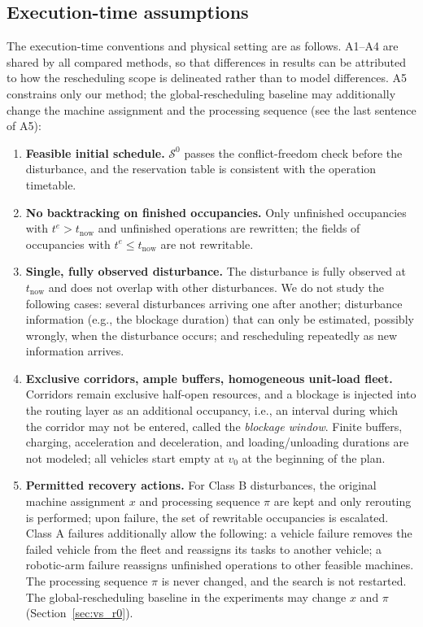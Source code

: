 \documentclass[manuscript,screen,review]{acmart}
\begin{document}
\subsection{Execution-time assumptions}
\label{sec:assumptions}

The execution-time conventions and physical setting are as follows. A1--A4 are shared by all compared methods, so that differences in results can be attributed to how the rescheduling scope
is delineated rather than to model differences. A5 constrains only our method; the global-rescheduling baseline may additionally change the machine assignment and the processing sequence (see the last sentence of A5):

\begin{enumerate}[label=\textbf{A\arabic*.},leftmargin=*,topsep=2pt,itemsep=2pt]
\item \textbf{Feasible initial schedule.} \(\mathcal{S}^0\) passes the conflict-freedom check before the disturbance, and the reservation table is consistent with the operation timetable.
\item \textbf{No backtracking on finished occupancies.} Only unfinished occupancies with \(t^e>t_{\mathrm{now}}\)
and unfinished operations are rewritten; the fields of occupancies with \(t^e\le t_{\mathrm{now}}\) are not rewritable.
\item \textbf{Single, fully observed disturbance.} The disturbance is fully observed at \(t_{\mathrm{now}}\) and does not overlap with other disturbances.
We do not study the following cases: several disturbances arriving one after another; disturbance information (e.g., the blockage duration) that can only be estimated, possibly wrongly, when the disturbance occurs;
and rescheduling repeatedly as new information arrives.
\item \textbf{Exclusive corridors, ample buffers, homogeneous unit-load fleet.} Corridors remain exclusive half-open resources, and a blockage is injected into the routing layer as an additional occupancy,
i.e., an interval during which the corridor may not be entered, called the \emph{blockage window}. Finite buffers, charging, acceleration and deceleration, and loading/unloading durations are not modeled;
all vehicles start empty at \(v_0\) at the beginning of the plan.
\item \textbf{Permitted recovery actions.} For Class B disturbances, the original machine assignment \(x\) and processing sequence \(\pi\) are kept and only rerouting is performed;
upon failure, the set of rewritable occupancies is escalated. Class A failures additionally allow the following: a vehicle failure removes the failed vehicle from the fleet and reassigns its tasks to another vehicle;
a robotic-arm failure reassigns unfinished operations to other feasible machines. The processing sequence \(\pi\) is never changed, and the search is not restarted.
The global-rescheduling baseline in the experiments may change \(x\) and \(\pi\) (Section~\ref{sec:vs_r0}).
\end{enumerate}
\end{document}
